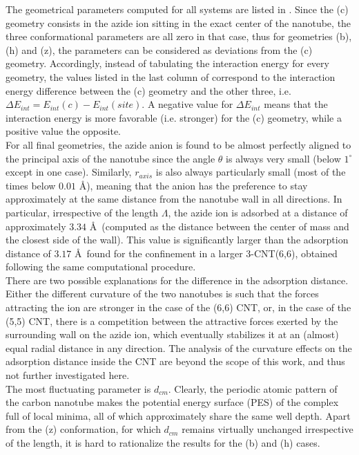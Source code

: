 \documentclass[utf8]{article}
\begin{document}
The geometrical parameters computed for all systems are listed in . Since the (c) geometry consists in the azide ion sitting in the exact center of the nanotube, the three conformational parameters are all zero in that case, thus for geometries (b), (h) and (z), the parameters can be considered as deviations from the (c) geometry. Accordingly, instead of tabulating the interaction energy for every geometry, the values listed in the last column of  correspond to the interaction energy difference between the (c) geometry and the other three, i.e. $\Delta E_{int} = E_{int}(c) - E_{int}(site)$. A negative value for $\Delta E_{int}$ means that the interaction energy is more favorable (i.e. stronger) for the (c) geometry, while a positive value the opposite.\\
For all final geometries, the azide anion is found to be almost perfectly aligned to the principal axis of the nanotube since the angle $\theta$ is always very small (below $1^{\circ}$ except in one case).
Similarly, $r_{axis}$ is also always particularly small (most of the times below $0.01$ \AA), meaning that the anion has the preference to stay approximately at the same distance from the nanotube wall in all directions.
In particular, irrespective of the length $\Lambda$, the azide ion is adsorbed at a distance of approximately $3.34$ \AA\ (computed as the distance between the \ntm center of mass and the closest side of the wall). This value is significantly larger than the adsorption distance of $3.17$ \AA\ found for the confinement in a larger 3-CNT(6,6), obtained following the same computational procedure.\\
There are two possible explanations for the difference in the adsorption distance. Either the different curvature of the two nanotubes is such that the forces attracting the ion are stronger in the case of the (6,6) CNT, or, in the case of the (5,5) CNT, there is a competition between the attractive forces exerted by the surrounding wall on the azide ion, which eventually stabilizes it at an (almost) equal radial distance in any direction.
The analysis of the curvature effects on the adsorption distance inside the CNT are beyond the scope of this work, and thus not further investigated here.\\
The most fluctuating parameter is $d_{cm}$. Clearly, the periodic atomic pattern of the carbon nanotube makes the potential energy surface (PES) of the complex full of local minima, all of which approximately share the same well depth. Apart from the (z) conformation, for which $d_{cm}$ remains virtually unchanged irrespective of the length, it is hard to rationalize the results for the (b) and (h) cases.
\end{document}
